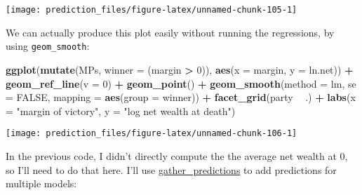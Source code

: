 \documentclass[]{book}
\newenvironment{Shaded}{\begin{snugshade}}{\end{snugshade}}
\newcommand{\CommentTok}[1]{\textcolor[rgb]{0.56,0.35,0.01}{\textit{#1}}}
\newcommand{\DataTypeTok}[1]{\textcolor[rgb]{0.13,0.29,0.53}{#1}}
\newcommand{\DecValTok}[1]{\textcolor[rgb]{0.00,0.00,0.81}{#1}}
\newcommand{\KeywordTok}[1]{\textcolor[rgb]{0.13,0.29,0.53}{\textbf{#1}}}
\newcommand{\NormalTok}[1]{#1}
\newcommand{\OperatorTok}[1]{\textcolor[rgb]{0.81,0.36,0.00}{\textbf{#1}}}
\newcommand{\OtherTok}[1]{\textcolor[rgb]{0.56,0.35,0.01}{#1}}
\newcommand{\StringTok}[1]{\textcolor[rgb]{0.31,0.60,0.02}{#1}}
\theoremstyle{definition}
\theoremstyle{definition}
\theoremstyle{definition}
\theoremstyle{remark}
\begin{document}
\begin{center}\texttt{[image: prediction\_files/figure-latex/unnamed-chunk-105-1]} \end{center}

We can actually produce this plot easily without running the
regressions, by using \texttt{geom\_smooth}:

\begin{Shaded}
\begin{Highlighting}[]
\KeywordTok{ggplot}\NormalTok{(}\KeywordTok{mutate}\NormalTok{(MPs, }\DataTypeTok{winner =}\NormalTok{ (margin }\OperatorTok{>}\StringTok{ }\DecValTok{0}\NormalTok{)),}
       \KeywordTok{aes}\NormalTok{(}\DataTypeTok{x =}\NormalTok{ margin, }\DataTypeTok{y =}\NormalTok{ ln.net)) }\OperatorTok{+}
\StringTok{  }\KeywordTok{geom_ref_line}\NormalTok{(}\DataTypeTok{v =} \DecValTok{0}\NormalTok{) }\OperatorTok{+}
\StringTok{  }\KeywordTok{geom_point}\NormalTok{() }\OperatorTok{+}
\StringTok{  }\KeywordTok{geom_smooth}\NormalTok{(}\DataTypeTok{method =}\NormalTok{ lm, }\DataTypeTok{se =} \OtherTok{FALSE}\NormalTok{, }\DataTypeTok{mapping =} \KeywordTok{aes}\NormalTok{(}\DataTypeTok{group =}\NormalTok{ winner)) }\OperatorTok{+}
\StringTok{  }\KeywordTok{facet_grid}\NormalTok{(party }\OperatorTok{~}\StringTok{ }\NormalTok{.) }\OperatorTok{+}
\StringTok{  }\KeywordTok{labs}\NormalTok{(}\DataTypeTok{x =} \StringTok{"margin of victory"}\NormalTok{, }\DataTypeTok{y =} \StringTok{"log net wealth at death"}\NormalTok{)}
\end{Highlighting}
\end{Shaded}

\begin{center}\texttt{[image: prediction\_files/figure-latex/unnamed-chunk-106-1]} \end{center}

In the previous code, I didn't directly compute the the average net
wealth at 0, so I'll need to do that here. I'll use
\href{https://www.rdocumentation.org/packages/modelr/topics/gather_predictions}{gather\_predictions}
to add predictions for multiple models:

\begin{Shaded}
\end{Shaded}
\end{document}
